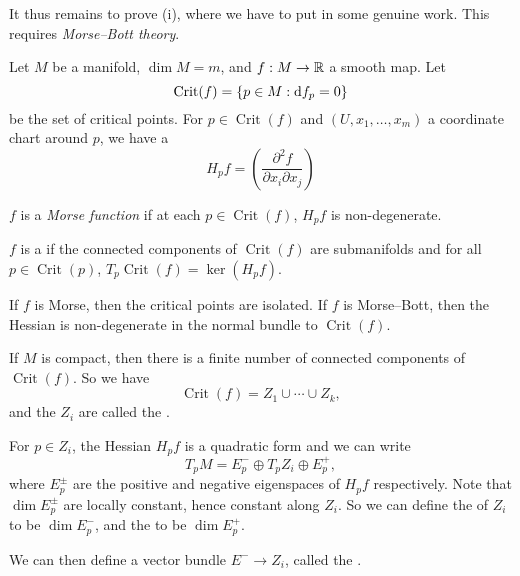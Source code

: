 \documentclass[a4paper]{article}
\DeclareMathOperator{\Crit}{Crit}
\begin{document}
It thus remains to prove (i), where we have to put in some genuine work. This requires \emph{Morse--Bott theory}.

Let $M$ be a manifold, $\dim M = m$, and $f: M \to \mathbb{R}$ a smooth map. Let
\[
  \Crit(f) = \{p \in M: \d f_p = 0\}
\]
be the set of critical points. For $p \in \Crit(f)$ and $(U, x_1, \ldots, x_m)$ a coordinate chart around $p$, we have a 
\[
  H_pf = \left( \frac{\partial^2 f}{\partial x_i \partial x_j}\right)
\]
\begin{defi}
  $f$ is a \emph{Morse function} if at each $p \in \Crit(f)$, $H_p f$ is non-degenerate.

  $f$ is a  if the connected components of $\Crit(f)$ are submanifolds and for all $p \in \Crit(p)$, $T_p \Crit(f) = \ker (H_p f)$.
\end{defi}
If $f$ is Morse, then the critical points are isolated. If $f$ is Morse--Bott, then the Hessian is non-degenerate in the normal bundle to $\Crit(f)$.

If $M$ is compact, then there is a finite number of connected components of $\Crit(f)$. So we have
\[
  \Crit(f) = Z_1 \cup \cdots \cup Z_k,
\]
and the $Z_i$ are called the .

For $p \in Z_i$, the Hessian $H_p f$ is a quadratic form and we can write
\[
  T_p M = E_p^- \oplus T_p Z_i \oplus E_p^+,
\]
where $E_p^{\pm}$ are the positive and negative eigenspaces of $H_p f$ respectively. Note that $\dim E_p^{\pm}$ are locally constant, hence constant along $Z_i$. So we can define the  of $Z_i$ to be $\dim E_p^-$, and the  to be $\dim E_p^+$.

We can then define a vector bundle $E^- \to Z_i$, called the .
\end{document}
